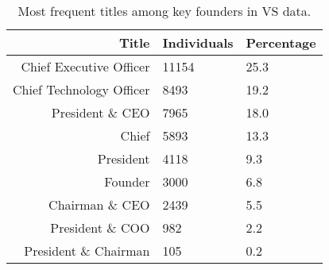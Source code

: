 \begin{table}[!htb]
\centering
\begingroup\normalsize
\begin{tabular}{rll}
  \toprule
Title & Individuals & Percentage \\ 
  \midrule
Chief Executive Officer & 11154 & 25.3 \\ 
  Chief Technology Officer & 8493 & 19.2 \\ 
  President \& CEO & 7965 & 18.0 \\ 
  Chief & 5893 & 13.3 \\ 
  President & 4118 & 9.3 \\ 
  Founder & 3000 & 6.8 \\ 
  Chairman \& CEO & 2439 & 5.5 \\ 
  President \& COO & 982 & 2.2 \\ 
  President \& Chairman & 105 & 0.2 \\ 
   \bottomrule
\end{tabular}
\endgroup
\caption{Most frequent titles among key founders in VS data.} 
\label{table:VS_founder2_titlesSummaryTable}
\end{table}
